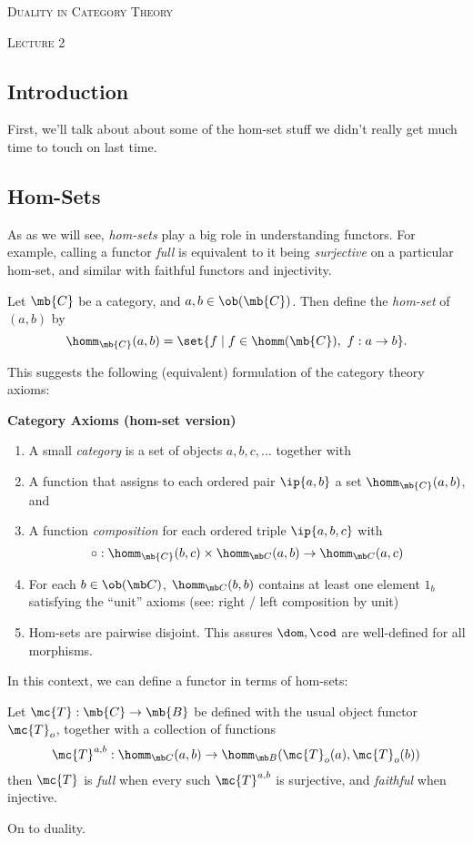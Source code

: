 \documentclass[nocover]{pset}
\begin{document}
\begin{center}
  {\scshape \huge Duality in Category Theory}

  {\scshape Lecture 2}
\end{center}
\vspace{-.1cm}
\hrulefill
\begin{adjustwidth}{1em}{1em}
  \section{Introduction}
  First, we'll talk about about some of the hom-set stuff we didn't
  really get much time to touch on last time.
  \subsection{Hom-Sets}
  As as we will see, \emph{hom-sets} play a big role in understanding
  functors. For example, calling a functor \emph{full} is equivalent
  to it being \emph{surjective} on a particular hom-set, and similar
  with faithful functors and injectivity.
  \begin{definition}
    Let $\mb{C}$ be a category, and $a,b \in \ob(\mb{C})$. Then define
    the \emph{hom-set} of $(a,b)$ by
    \[
      \homm_{\mb{C}}(a,b) = \set{f \mid f \in \homm(\mb{C}),\ f : a
        \to b}.
    \]
  \end{definition}
  This suggests the following (equivalent) formulation of the category
  theory axioms:
  \begin{leftbar}
    {\large \bfseries Category Axioms (hom-set version)}
    \begin{enumerate}[label=(\roman*)]
      \item A small \emph{category} is a set of objects $a,b,c,\ldots$
        together with
      \item A function that assigns to each ordered pair $\ip{a,b}$ a
        set $\homm_{\mb{C}}(a,b)$, and
      \item A function \emph{composition} for each ordered triple
        $\ip{a,b,c}$ with
        \[
          \circ : \homm_{\mb{C}}(b,c) \times \homm_{\mb C}(a,b) \to
          \homm_{\mb C}(a,c)
        \]
      \item For each $b \in \ob(\mb C)$, $\homm_{\mb C}(b,b)$ contains
        at least one element $1_b$ satisfying the ``unit'' axioms
        (see: right / left composition by unit)
      \item Hom-sets are pairwise disjoint. This assures $\dom, \cod$
        are well-defined for all morphisms.
    \end{enumerate}
  \end{leftbar}
  In this context, we can define a functor in terms of hom-sets:
  \begin{definition}
    Let $\mc{T} : \mb{C} \to \mb{B}$ be defined with the usual object
    functor $\mc{T}_o$, together with a collection of functions
    \[
      \mc{T}^{a,b} : \homm_{\mb C}(a,b) \to \homm_{\mb B}(\mc{T}_o(a),
      \mc{T}_o(b))
    \]
    then $\mc{T}$ is \emph{full} when every such $\mc{T}^{a,b}$ is
    surjective, and \emph{faithful} when injective.
  \end{definition}
  On to duality.

\end{adjustwidth}
\end{document}
